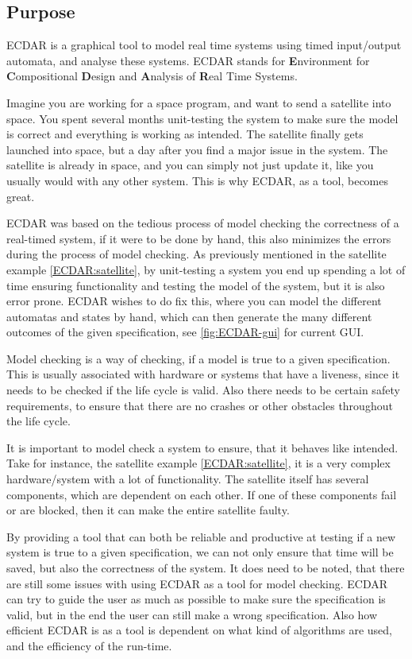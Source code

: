\subsection{Purpose}
ECDAR is a graphical tool to model real time systems using timed input/output automata, and analyse these systems. 
ECDAR stands for \textbf{E}nvironment for \textbf{C}ompositional \textbf{D}esign and \textbf{A}nalysis of \textbf{R}eal Time Systems.

Imagine you are working for a space program, and want to send a satellite into space.
You spent several months unit-testing the system to make sure the model is correct and everything is working as intended.
The satellite finally gets launched into space, but a day after you find a major issue in the system.
The satellite is already in space, and you can simply not just update it, like you usually would with any other system.
This is why ECDAR, as a tool, becomes great. \label{ECDAR:satellite}

ECDAR was based on the tedious process of model checking the correctness of a real-timed system, if it were to be done by hand, this also minimizes the errors during the process of model checking.
As previously mentioned in the satellite example \ref{ECDAR:satellite}, by unit-testing a system you end up spending a lot of time ensuring functionality and testing the model of the system, but it is also error prone.
ECDAR wishes to do fix this, where you can model the different automatas and states by hand, which can then generate the many different outcomes of the given specification, see \ref{fig:ECDAR-gui} for current GUI.

Model checking is a way of checking, if a model is true to a given specification.
This is usually associated with hardware or systems that have a liveness, since it needs to be checked if the life cycle is valid.
Also there needs to be certain safety requirements, to ensure that there are no crashes or other obstacles throughout the life cycle.

It is important to model check a system to ensure, that it behaves like intended.
Take for instance, the satellite example \ref{ECDAR:satellite}, it is a very complex hardware/system with a lot of functionality.
The satellite itself has several components, which are dependent on each other.
If one of these components fail or are blocked, then it can make the entire satellite faulty.

By providing a tool that can both be reliable and productive at testing if a new system is true to a given specification, we can not only ensure that time will be saved, but also the correctness of the system.
It does need to be noted, that there are still some issues with using ECDAR as a tool for model checking.
ECDAR can try to guide the user as much as possible to make sure the specification is valid, but in the end the user can still make a wrong specification.
Also how efficient ECDAR is as a tool is dependent on what kind of algorithms are used, and the efficiency of the run-time.

